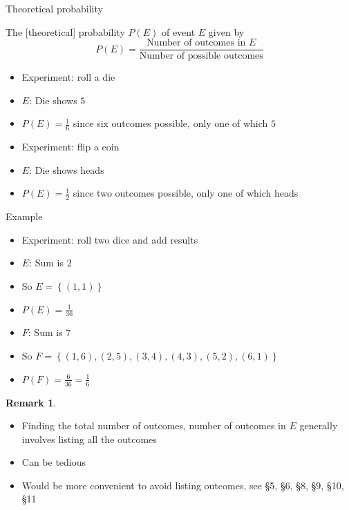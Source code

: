 \documentclass[handout]{beamer}
\theoremstyle{definition}
\newtheorem{remark}{Remark}
\begin{document}
\begin{frame}{Theoretical probability}
\begin{definition} The \alert{[theoretical] probability} $P\left(E\right)$
of event $E$ given by
\[P\left(E\right)
=\frac{\text{Number of outcomes in $E$}}{\text{Number of possible outcomes}}\]
\end{definition}
\begin{example}
\begin{itemize}
\item Experiment: roll a die
\item $E$: Die shows $5$
\item $P\left(E\right)=\frac{1}{6}$ since six outcomes possible,
only one of which $5$
\end{itemize}
\end{example}
\begin{example}
\begin{itemize}
\item Experiment: flip a coin
\item $E$: Die shows heads
\item $P\left(E\right)=\frac{1}{2}$ since two outcomes possible,
only one of which heads
\end{itemize}
\end{example}
\end{frame}

\begin{frame}{Example}
\begin{itemize}
\item Experiment: roll two dice and add results
\item $E$: Sum is $2$
\item So $E=\left\{\left(1,1\right)\right\}$
\item $P\left(E\right)=\frac{1}{36}$
\item $F$: Sum is $7$
\item So $F=\left\{\left(1,6\right),
\left(2,5\right),\left(3,4\right),
\left(4,3\right),\left(5,2\right),\left(6,1\right)\right\}$
\item $P\left(F\right)=\frac{6}{36}=\frac{1}{6}$
\end{itemize}
\begin{remark}
\begin{itemize}
\item Finding the total number of outcomes, number of outcomes in $E$
generally involves \alert{listing} all the outcomes
\item Can be tedious
\item Would be more convenient to avoid listing outcomes, see \S5, \S6, \S8,
\S9, \S10, \S11
\end{itemize}
\end{remark}
\end{frame}
\end{document}
